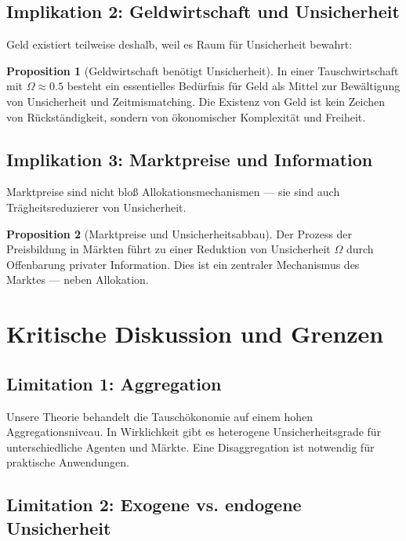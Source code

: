 \documentclass[a4paper,12pt]{article}
\theoremstyle{definition}
\newtheorem{proposition}{Proposition}
\begin{document}
\subsection{Implikation 2: Geldwirtschaft und Unsicherheit}

Geld existiert teilweise deshalb, weil es Raum für Unsicherheit bewahrt:

\begin{proposition}[Geldwirtschaft benötigt Unsicherheit]
    In einer Tauschwirtschaft mit $\Omega \approx 0.5$ besteht ein essentielles Bedürfnis für Geld als Mittel zur Bewältigung von Unsicherheit und Zeitmismatching. Die Existenz von Geld ist kein Zeichen von Rückständigkeit, sondern von ökonomischer Komplexität und Freiheit.
\end{proposition}

\subsection{Implikation 3: Marktpreise und Information}

Marktpreise sind nicht bloß Allokationsmechanismen --- sie sind auch Trägheitsreduzierer von Unsicherheit.

\begin{proposition}[Marktpreise und Unsicherheitsabbau]
    Der Prozess der Preisbildung in Märkten führt zu einer Reduktion von Unsicherheit $\Omega$ durch Offenbarung privater Information. Dies ist ein zentraler Mechanismus des Marktes --- neben Allokation.
\end{proposition}

\section{Kritische Diskussion und Grenzen}

\subsection{Limitation 1: Aggregation}

Unsere Theorie behandelt die Tauschökonomie auf einem hohen Aggregationsniveau. In Wirklichkeit gibt es heterogene Unsicherheitsgrade für unterschiedliche Agenten und Märkte. Eine Disaggregation ist notwendig für praktische Anwendungen.

\subsection{Limitation 2: Exogene vs. endogene Unsicherheit}
\end{document}
